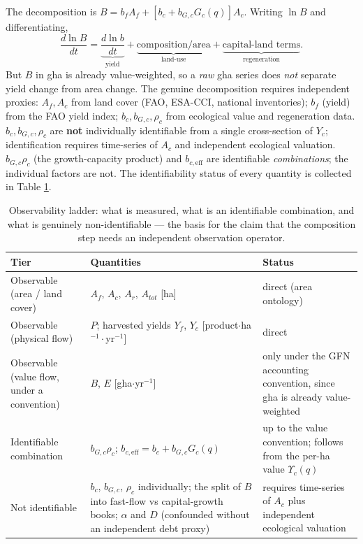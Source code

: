 \documentclass[11pt]{article}
\begin{document}
The decomposition is $B=b_fA_f+[b_c+b_{G,c}G_c(q)]A_c$. Writing $\ln B$ and differentiating,
\[
\frac{d\ln B}{dt}=\underbrace{\frac{d\ln b}{dt}}_{\text{yield}}+\underbrace{\text{composition/area}}_{\text{land-use}}+\underbrace{\text{capital-land terms}}_{\text{regeneration}}.
\]
But $B$ in gha is already value-weighted, so a \emph{raw} gha series does \emph{not} separate yield change from area change. The genuine decomposition requires independent proxies: $A_f,A_c$ from land cover (FAO, ESA-CCI, national inventories); $b_f$ (yield) from the FAO yield index; $b_c,b_{G,c},\rho_c$ from ecological value and regeneration data. $b_c,b_{G,c},\rho_c$ are \textbf{not} individually identifiable from a single cross-section of $Y_c$; identification requires time-series of $A_c$ and independent ecological valuation. $b_{G,c}\rho_c$ (the growth-capacity product) and $b_{c,\mathrm{eff}}$ are identifiable \emph{combinations}; the individual factors are not. The identifiability status of every quantity is collected in Table \ref{tab:ladder}.

\begin{table}[htbp]
\centering
\small
\begin{tabularx}{\textwidth}{>{\raggedright\arraybackslash}X>{\raggedright\arraybackslash}X>{\raggedright\arraybackslash}X}
\toprule
Tier & Quantities & Status \\
\midrule
Observable (area / land cover) & $A_f$, $A_c$, $A_r$, $A_{tot}$ [ha] & direct (area ontology) \\
Observable (physical flow) & $P$; harvested yields $Y_f$, $Y_c$ [product$\cdot$ha$^{-1}\cdot$yr$^{-1}$] & direct \\
Observable (value flow, under a convention) & $B$, $E$ [gha$\cdot$yr$^{-1}$] & only under the GFN accounting convention, since gha is already value-weighted \\
Identifiable combination & $b_{G,c}\rho_c$; $b_{c,\mathrm{eff}}=b_c+b_{G,c}G_c(q)$ & up to the value convention; follows from the per-ha value $\Upsilon_c(q)$ \\
Not identifiable & $b_c$, $b_{G,c}$, $\rho_c$ individually; the split of $B$ into fast-flow vs capital-growth books; $\alpha$ and $D$ (confounded without an independent debt proxy) & requires time-series of $A_c$ plus independent ecological valuation \\
\bottomrule
\end{tabularx}
\caption{Observability ladder: what is measured, what is an identifiable combination, and what is genuinely
non-identifiable --- the basis for the claim that the composition step needs an independent observation operator.}
\label{tab:ladder}
\end{table}
\end{document}
